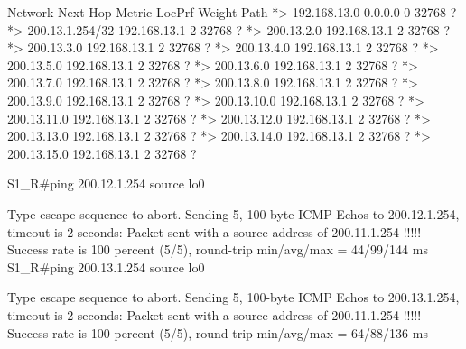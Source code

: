 \documentclass[10pt]{article}
\begin{document}
\begin{itemize}
\begin{verbatim*}
		   Network          Next Hop            Metric LocPrf Weight Path
		*> 192.168.13.0     0.0.0.0                  0         32768 ?
		*> 200.13.1.254/32  192.168.13.1             2         32768 ?
		*> 200.13.2.0       192.168.13.1             2         32768 ?
		*> 200.13.3.0       192.168.13.1             2         32768 ?
		*> 200.13.4.0       192.168.13.1             2         32768 ?
		*> 200.13.5.0       192.168.13.1             2         32768 ?
		*> 200.13.6.0       192.168.13.1             2         32768 ?
		*> 200.13.7.0       192.168.13.1             2         32768 ?
		*> 200.13.8.0       192.168.13.1             2         32768 ?
		*> 200.13.9.0       192.168.13.1             2         32768 ?
		*> 200.13.10.0      192.168.13.1             2         32768 ?
		*> 200.13.11.0      192.168.13.1             2         32768 ?
		*> 200.13.12.0      192.168.13.1             2         32768 ?
		*> 200.13.13.0      192.168.13.1             2         32768 ?
		*> 200.13.14.0      192.168.13.1             2         32768 ?
		*> 200.13.15.0      192.168.13.1             2         32768 ?

		S1_R#ping 200.12.1.254 source lo0

		Type escape sequence to abort.
		Sending 5, 100-byte ICMP Echos to 200.12.1.254, timeout is 2 seconds:
		Packet sent with a source address of 200.11.1.254
		!!!!!
		Success rate is 100 percent (5/5), round-trip min/avg/max = 44/99/144 ms
		S1_R#ping 200.13.1.254 source lo0

		Type escape sequence to abort.
		Sending 5, 100-byte ICMP Echos to 200.13.1.254, timeout is 2 seconds:
		Packet sent with a source address of 200.11.1.254
		!!!!!
		Success rate is 100 percent (5/5), round-trip min/avg/max = 64/88/136 ms
	\end{verbatim*}
\end{itemize}
\end{document}
